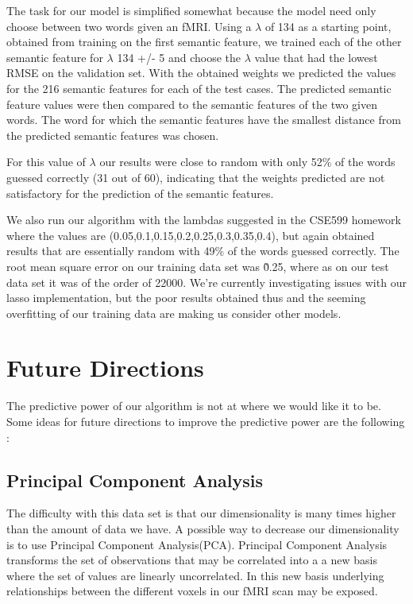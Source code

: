 \documentclass{article} %
\begin{document}
The task for our model is simplified somewhat because the model need only choose between two words given an fMRI. Using a $\lambda$ of 134 as a starting point, obtained from training on the first semantic feature, we trained each of the other semantic feature for $\lambda$ 134 +/- 5 and choose the $\lambda$ value that had the lowest RMSE on the validation set. With the obtained weights we predicted the values for the 216 semantic features for each of the test cases. The predicted semantic feature values were then compared to the semantic features of the two given words. The word for which the semantic features have the smallest distance from the predicted semantic features was chosen. 

For this value of $\lambda$ our results were close to random with only 52\% of the words guessed correctly (31 out of 60), indicating that the weights predicted are not satisfactory for the prediction of the semantic features.

We also run our algorithm with the lambdas suggested in the CSE599 homework where the values are (0.05,0.1,0.15,0.2,0.25,0.3,0.35,0.4), but again obtained results that are essentially random with 49\% of the words guessed correctly. The root mean square error on our training data set was \~0.25, where as on our test data set it was of the order of 22000. We're currently investigating issues with our lasso implementation, but the poor results obtained thus and the seeming overfitting of our training data are making us consider other models.


\section{Future Directions}

The predictive power of our algorithm is not at where we would like it to be. Some ideas for future directions to improve the predictive power are the following :

\subsection{Principal Component Analysis}
The difficulty with this data set is that our dimensionality is many times higher than the amount of data we have. A possible way to decrease our dimensionality is to use Principal Component Analysis(PCA).  Principal Component Analysis transforms the set of observations that may be correlated into a a new basis where the set of values are linearly uncorrelated. In this new basis underlying relationships between the different voxels in our fMRI scan may be exposed. 
\end{document}
